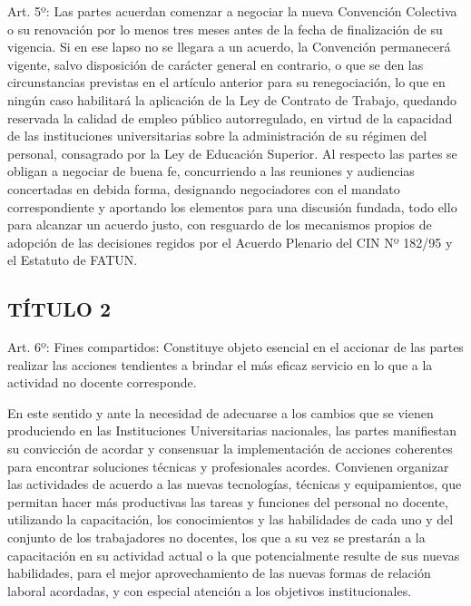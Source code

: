 \documentclass[]{article}
\begin{document}
Art. 5º: Las partes acuerdan comenzar a negociar la nueva Convención
Colectiva o su renovación por lo menos tres meses antes de la fecha de
finalización de su vigencia. Si en ese lapso no se llegara a un acuerdo,
la Convención permanecerá vigente, salvo disposición de carácter general
en contrario, o que se den las circunstancias previstas en el artículo
anterior para su renegociación, lo que en ningún caso habilitará la
aplicación de la Ley de Contrato de Trabajo, quedando reservada la
calidad de empleo público autorregulado, en virtud de la capacidad de
las instituciones universitarias sobre la administración de su régimen
del personal, consagrado por la Ley de Educación Superior. Al respecto
las partes se obligan a negociar de buena fe, concurriendo a las
reuniones y audiencias concertadas en debida forma, designando
negociadores con el mandato correspondiente y aportando los elementos
para una discusión fundada, todo ello para alcanzar un acuerdo justo,
con resguardo de los mecanismos propios de adopción de las decisiones
regidos por el Acuerdo Plenario del CIN Nº 182/95 y el Estatuto de
FATUN.

\subsection{TÍTULO 2}\label{tuxedtulo-2}


Art. 6º: Fines compartidos: Constituye objeto esencial en el accionar de
las partes realizar las acciones tendientes a brindar el más eficaz
servicio en lo que a la actividad no docente corresponde.

En este sentido y ante la necesidad de adecuarse a los cambios que se
vienen produciendo en las Instituciones Universitarias nacionales, las
partes manifiestan su convicción de acordar y consensuar la
implementación de acciones coherentes para encontrar soluciones técnicas
y profesionales acordes. Convienen organizar las actividades de acuerdo
a las nuevas tecnologías, técnicas y equipamientos, que permitan hacer
más productivas las tareas y funciones del personal no docente,
utilizando la capacitación, los conocimientos y las habilidades de cada
uno y del conjunto de los trabajadores no docentes, los que a su vez se
prestarán a la capacitación en su actividad actual o la que
potencialmente resulte de sus nuevas habilidades, para el mejor
aprovechamiento de las nuevas formas de relación laboral acordadas, y
con especial atención a los objetivos institucionales.
\end{document}
